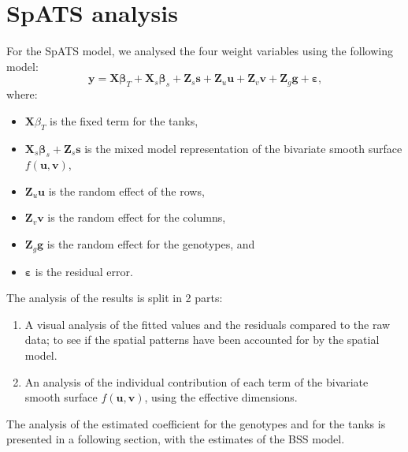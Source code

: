 \section{SpATS analysis}
For the SpATS model, we analysed the four weight variables using the following model:
\begin{equation}
	\mathbf{y} =\mathbf{X} \boldsymbol{\beta}_{T} +\mathbf{X}_{s} \boldsymbol{\beta}_{s}+\mathbf{Z}_{s} \boldsymbol{s}+\mathbf{Z}_{u} \boldsymbol{u}
	+ \mathbf{Z}_{v} \boldsymbol{v} + \mathbf{Z}_{g} \boldsymbol{g}+ \boldsymbol{\varepsilon} \text{,}
\end{equation}
where:
\begin{itemize}
	\item $\mathbf{X} \beta_{T}$ is the fixed term for the tanks,
	\item $\mathbf{X}_{s} \boldsymbol{\beta}_{s}+\mathbf{Z}_{s} \boldsymbol{s}$ is the mixed model representation of the bivariate smooth surface $f(\boldsymbol{u},\boldsymbol{v})$,
	\item $\mathbf{Z}_{u} \boldsymbol{u}$ is the random effect of the rows,
	\item $\mathbf{Z}_{v} \boldsymbol{v}$ is the random effect for the columns,
	\item $\mathbf{Z}_{g} \boldsymbol{g}$ is the random effect for the genotypes, and 
	\item $\boldsymbol{\varepsilon}$ is the residual error.
\end{itemize}

The analysis of the results is split in 2 parts:
\begin{enumerate}
	\item A visual analysis of the fitted values and the residuals compared to the raw data; to see if the 
	spatial patterns have been accounted for by the spatial model.
	\item An analysis of the individual contribution of each term of the bivariate smooth surface $f(\boldsymbol{u},\boldsymbol{v})$, using the effective dimensions.
\end{enumerate}
The analysis of the estimated coefficient for the genotypes and for the tanks is presented in a following section, with the estimates of the BSS model.

